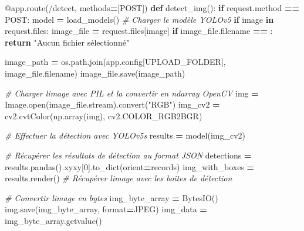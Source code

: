 \documentclass[
  10pt,
]{article}
\newenvironment{Shaded}{\begin{snugshade}}{\end{snugshade}}
\newcommand{\AttributeTok}[1]{\textcolor[rgb]{0.13,0.29,0.53}{#1}}
\newcommand{\BuiltInTok}[1]{#1}
\newcommand{\CommentTok}[1]{\textcolor[rgb]{0.56,0.35,0.01}{\textit{#1}}}
\newcommand{\ControlFlowTok}[1]{\textcolor[rgb]{0.13,0.29,0.53}{\textbf{#1}}}
\newcommand{\DecValTok}[1]{\textcolor[rgb]{0.00,0.00,0.81}{#1}}
\newcommand{\KeywordTok}[1]{\textcolor[rgb]{0.13,0.29,0.53}{\textbf{#1}}}
\newcommand{\NormalTok}[1]{#1}
\newcommand{\OperatorTok}[1]{\textcolor[rgb]{0.81,0.36,0.00}{\textbf{#1}}}
\newcommand{\StringTok}[1]{\textcolor[rgb]{0.31,0.60,0.02}{#1}}
\begin{document}
\begin{Shaded}
\begin{Highlighting}[]
\AttributeTok{@app.route}\NormalTok{(}\StringTok{\textquotesingle{}/detect\textquotesingle{}}\NormalTok{, methods}\OperatorTok{=}\NormalTok{[}\StringTok{\textquotesingle{}POST\textquotesingle{}}\NormalTok{])}
\KeywordTok{def}\NormalTok{ detect\_img():}
    \ControlFlowTok{if}\NormalTok{ request.method }\OperatorTok{==} \StringTok{\textquotesingle{}POST\textquotesingle{}}\NormalTok{:}
\NormalTok{        model }\OperatorTok{=}\NormalTok{ load\_models()  }\CommentTok{\# Charger le modèle YOLOv5}
        \ControlFlowTok{if} \StringTok{\textquotesingle{}image\textquotesingle{}} \KeywordTok{in}\NormalTok{ request.files:}
\NormalTok{            image\_file }\OperatorTok{=}\NormalTok{ request.files[}\StringTok{\textquotesingle{}image\textquotesingle{}}\NormalTok{]}
            \ControlFlowTok{if}\NormalTok{ image\_file.filename }\OperatorTok{==} \StringTok{\textquotesingle{}\textquotesingle{}}\NormalTok{:}
                \ControlFlowTok{return} \StringTok{"Aucun fichier sélectionné"}
            
\NormalTok{            image\_path }\OperatorTok{=}\NormalTok{ os.path.join(app.config[}\StringTok{\textquotesingle{}UPLOAD\_FOLDER\textquotesingle{}}\NormalTok{], image\_file.filename)}
\NormalTok{            image\_file.save(image\_path)}

            \CommentTok{\# Charger l\textquotesingle{}image avec PIL et la convertir en ndarray OpenCV}
\NormalTok{            img }\OperatorTok{=}\NormalTok{ Image.}\BuiltInTok{open}\NormalTok{(image\_file.stream).convert(}\StringTok{"RGB"}\NormalTok{)}
\NormalTok{            img\_cv2 }\OperatorTok{=}\NormalTok{ cv2.cvtColor(np.array(img), cv2.COLOR\_RGB2BGR)}

            \CommentTok{\# Effectuer la détection avec YOLOv5s}
\NormalTok{            results }\OperatorTok{=}\NormalTok{ model(img\_cv2)}

            \CommentTok{\# Récupérer les résultats de détection au format JSON}
\NormalTok{            detections }\OperatorTok{=}\NormalTok{ results.pandas().xyxy[}\DecValTok{0}\NormalTok{].to\_dict(orient}\OperatorTok{=}\StringTok{\textquotesingle{}records\textquotesingle{}}\NormalTok{)}
\NormalTok{            img\_with\_boxes }\OperatorTok{=}\NormalTok{ results.render()  }
            \CommentTok{\# Récupérer l\textquotesingle{}image avec les boîtes de détection}

            \CommentTok{\# Convertir l\textquotesingle{}image en bytes}
\NormalTok{            img\_byte\_array }\OperatorTok{=}\NormalTok{ BytesIO()}
\NormalTok{            img.save(img\_byte\_array, }\BuiltInTok{format}\OperatorTok{=}\StringTok{\textquotesingle{}JPEG\textquotesingle{}}\NormalTok{)}
\NormalTok{            img\_data }\OperatorTok{=}\NormalTok{ img\_byte\_array.getvalue()}


\end{Highlighting}
\end{Shaded}
\end{document}
